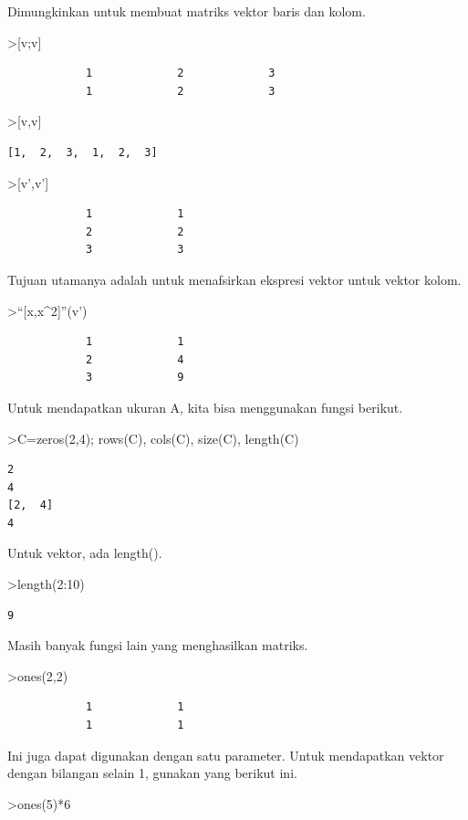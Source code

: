 \documentclass[
]{book}
\begin{document}
Dimungkinkan untuk membuat matriks vektor baris dan kolom.

\textgreater{[}v;v{]}

\begin{verbatim}
            1             2             3 
            1             2             3 
\end{verbatim}

\textgreater{[}v,v{]}

\begin{verbatim}
[1,  2,  3,  1,  2,  3]
\end{verbatim}

\textgreater{[}v',v'{]}

\begin{verbatim}
            1             1 
            2             2 
            3             3 
\end{verbatim}

Tujuan utamanya adalah untuk menafsirkan ekspresi vektor untuk vektor kolom.

\textgreater{}``{[}x,x\^{}2{]}''(v')

\begin{verbatim}
            1             1 
            2             4 
            3             9 
\end{verbatim}

Untuk mendapatkan ukuran A, kita bisa menggunakan fungsi berikut.

\textgreater C=zeros(2,4); rows(C), cols(C), size(C), length(C)

\begin{verbatim}
2
4
[2,  4]
4
\end{verbatim}

Untuk vektor, ada length().

\textgreater length(2:10)

\begin{verbatim}
9
\end{verbatim}

Masih banyak fungsi lain yang menghasilkan matriks.

\textgreater ones(2,2)

\begin{verbatim}
            1             1 
            1             1 
\end{verbatim}

Ini juga dapat digunakan dengan satu parameter. Untuk mendapatkan vektor dengan bilangan selain 1, gunakan yang berikut ini.

\textgreater ones(5)*6
\end{document}
